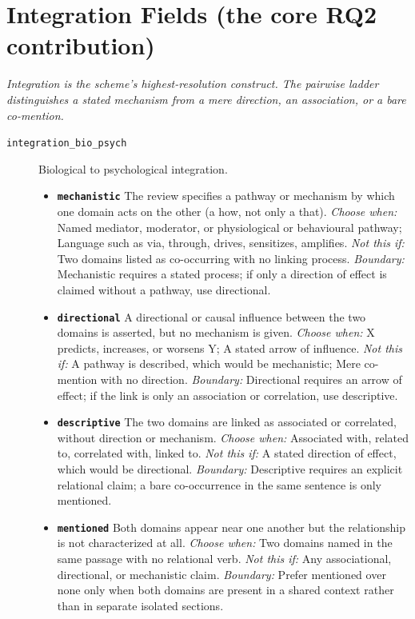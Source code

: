 \documentclass[11pt]{article}
\begin{document}
\section*{Integration Fields (the core RQ2 contribution)}
{\small\itshape Integration is the scheme's highest-resolution construct. The pairwise ladder distinguishes a stated mechanism from a mere direction, an association, or a bare co-mention.}\par\smallskip
\begin{description}
\item[\texttt{integration\_bio\_psych}] Biological to psychological integration.
  \begin{itemize}[leftmargin=1.3em,itemsep=2pt,topsep=2pt]
  \item \textbf{\texttt{mechanistic}} The review specifies a pathway or mechanism by which one domain acts on the other (a how, not only a that). {\small \textit{Choose when:} Named mediator, moderator, or physiological or behavioural pathway; Language such as via, through, drives, sensitizes, amplifies. \textit{Not this if:} Two domains listed as co-occurring with no linking process. \textit{Boundary:} Mechanistic requires a stated process; if only a direction of effect is claimed without a pathway, use directional.}
  \item \textbf{\texttt{directional}} A directional or causal influence between the two domains is asserted, but no mechanism is given. {\small \textit{Choose when:} X predicts, increases, or worsens Y; A stated arrow of influence. \textit{Not this if:} A pathway is described, which would be mechanistic; Mere co-mention with no direction. \textit{Boundary:} Directional requires an arrow of effect; if the link is only an association or correlation, use descriptive.}
  \item \textbf{\texttt{descriptive}} The two domains are linked as associated or correlated, without direction or mechanism. {\small \textit{Choose when:} Associated with, related to, correlated with, linked to. \textit{Not this if:} A stated direction of effect, which would be directional. \textit{Boundary:} Descriptive requires an explicit relational claim; a bare co-occurrence in the same sentence is only mentioned.}
  \item \textbf{\texttt{mentioned}} Both domains appear near one another but the relationship is not characterized at all. {\small \textit{Choose when:} Two domains named in the same passage with no relational verb. \textit{Not this if:} Any associational, directional, or mechanistic claim. \textit{Boundary:} Prefer mentioned over none only when both domains are present in a shared context rather than in separate isolated sections.}

\end{itemize}
\end{description}
\end{document}
